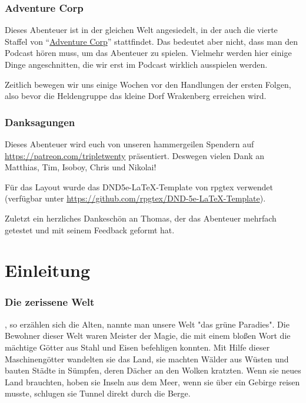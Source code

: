 \subsection{Adventure Corp}

Dieses Abenteuer ist in der gleichen Welt angesiedelt, in der auch die vierte Staffel von ``\href{https://tripletwenty.net/2020/01/07/adventure-corp-s4e01/}{Adventure Corp}'' stattfindet. Das bedeutet aber nicht, dass man den Podcast hören muss, um das Abenteuer zu spielen. Vielmehr werden hier einige Dinge angeschnitten, die wir erst im Podcast wirklich ausspielen werden.

Zeitlich bewegen wir uns einige Wochen vor den Handlungen der ersten Folgen, also bevor die Heldengruppe das kleine Dorf Wrakenberg erreichen wird.

\subsection{Danksagungen}

Dieses Abenteuer wird euch von unseren hammergeilen Spendern auf \url{https://patreon.com/tripletwenty} präsentiert. Deswegen vielen Dank an Matthias, Tim, Isoboy, Chris und Nikolai!

Für das Layout wurde das DND5e-LaTeX-Template von rpgtex verwendet (verfügbar unter \url{https://github.com/rpgtex/DND-5e-LaTeX-Template}).

Zuletzt ein herzliches Dankeschön an Thomas, der das Abenteuer mehrfach getestet und mit seinem Feedback geformt hat.

\chapter*{Einleitung}

\subsection{Die zerissene Welt}

, so erzählen sich die Alten, nannte man unsere Welt "das grüne Paradies". Die Bewohner dieser Welt waren Meister der Magie, die mit einem bloßen Wort die mächtige Götter aus Stahl und Eisen befehligen konnten. Mit Hilfe dieser Maschinengötter wandelten sie das Land, sie machten Wälder aus Wüsten und bauten Städte in Sümpfen, deren Dächer an den Wolken kratzten. Wenn sie neues Land brauchten, hoben sie Inseln aus dem Meer, wenn sie über ein Gebirge reisen musste, schlugen sie Tunnel direkt durch die Berge.

